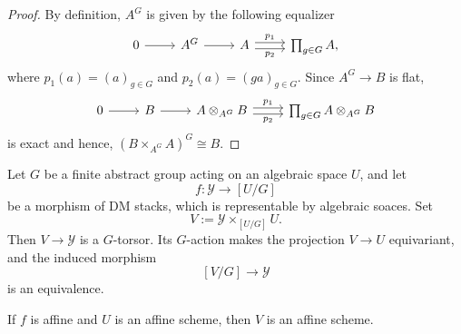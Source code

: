 \begin{proof}
	By definition, $A^G$ is given by the following equalizer
	\[\begin{tikzcd}
		0 & {A^G} & A & {\prod_{g\in G}A,}
		\arrow[from=1-1, to=1-2]
		\arrow[from=1-2, to=1-3]
		\arrow["{p_1}", shift left, from=1-3, to=1-4]
		\arrow["{p_2}"', shift right, from=1-3, to=1-4]
	\end{tikzcd}\]
	where $p_1(a) = (a)_{g\in G}$ and $p_2(a) = (ga)_{g\in G}$.
	Since $A^G \to B$ is flat,
	\[\begin{tikzcd}
		0 & B & {A\otimes_{A^G}B} & {\prod_{g\in G}A\otimes_{A^G}B}
		\arrow[from=1-1, to=1-2]
		\arrow[from=1-2, to=1-3]
		\arrow["{p_1}", shift left, from=1-3, to=1-4]
		\arrow["{p_2}"', shift right, from=1-3, to=1-4]
	\end{tikzcd}\]
	is exact and hence, $(B\times_{A^G} A)^G \cong B$.
\end{proof}


\begin{lemma}
	\label{lem:pullback-quotient-presentation}
	Let $G$ be a finite abstract group acting on an algebraic
	space $U$, and let
	\[
	f:\mathcal{Y}\longrightarrow[U/G]
	\]
	be a morphism of DM stacks, which is representable by algebraic soaces. Set
	\[
	V:=\mathcal{Y}\times_{[U/G]}U.
	\]
	Then $V\to\mathcal{Y}$ is a $G$-torsor. Its $G$-action
	makes the projection $V\to U$ equivariant, and the induced
	morphism
	\[
	[V/G]\longrightarrow\mathcal{Y}
	\]
	is an equivalence.
	
	If $f$ is affine and $U$ is an affine scheme, then $V$ is an affine scheme.
\end{lemma}

